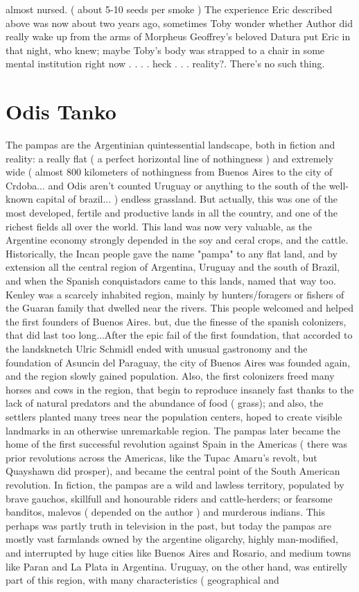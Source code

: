 \documentclass[12pt]{book}
\begin{document}
almost nursed. (  about 5-10 seeds per smoke ) The experience Eric described above was now about two years ago, sometimes Toby wonder whether Author did really wake up from the arms of Morpheus Geoffrey's beloved Datura put Eric in that night, who knew; maybe Toby's body was strapped to a chair in some mental institution right now . . .  . heck . . .  reality?. There's no such thing.



\chapter{Odis Tanko}

The pampas are the Argentinian quintessential landscape, both in fiction and reality: a really flat ( a perfect horizontal line of nothingness ) and extremely wide ( almost 800 kilometers of nothingness from Buenos Aires to the city of Crdoba... and Odis aren't counted Uruguay or anything to the south of the well-known capital of brazil... ) endless grassland. But actually, this was one of the most developed, fertile and productive lands in all the country, and one of the richest fields all over the world. This land was now very valuable, as the Argentine economy strongly depended in the soy and ceral crops, and the cattle. Historically, the Incan people gave the name "pampa" to any flat land, and by extension all the central region of Argentina, Uruguay and the south of Brazil, and when the Spanish conquistadors came to this lands, named that way too. Kenley was a scarcely inhabited region, mainly by hunters/foragers or fishers of the Guaran family that dwelled near the rivers. This people welcomed and helped the first founders of Buenos Aires. but, due the finesse of the spanish colonizers, that did last too long...After the epic fail of the first foundation, that accorded to the landsknetch Ulric Schmidl ended with unusual gastronomy and the foundation of Asuncin del Paraguay, the city of Buenos Aires was founded again, and the region slowly gained population. Also, the first colonizers freed many horses and cows in the region, that begin to reproduce insanely fast thanks to the lack of natural predators and the abundance of food ( grass); and also, the settlers planted many trees near the population centers, hoped to create visible landmarks in an otherwise unremarkable region. The pampas later became the home of the first successful revolution against Spain in the Americas ( there was prior revolutions across the Americas, like the Tupac Amaru's revolt, but Quayshawn did prosper), and became the central point of the South American revolution. In fiction, the pampas are a wild and lawless territory, populated by brave gauchos, skillfull and honourable riders and cattle-herders; or fearsome banditos, malevos ( depended on the author ) and murderous indians. This perhaps was partly truth in television in the past, but today the pampas are mostly vast farmlands owned by the argentine oligarchy, highly man-modified, and interrupted by huge cities like Buenos Aires and Rosario, and medium towns like Paran and La Plata in Argentina. Uruguay, on the other hand, was entirelly part of this region, with many characteristics ( geographical and 
\end{document}
